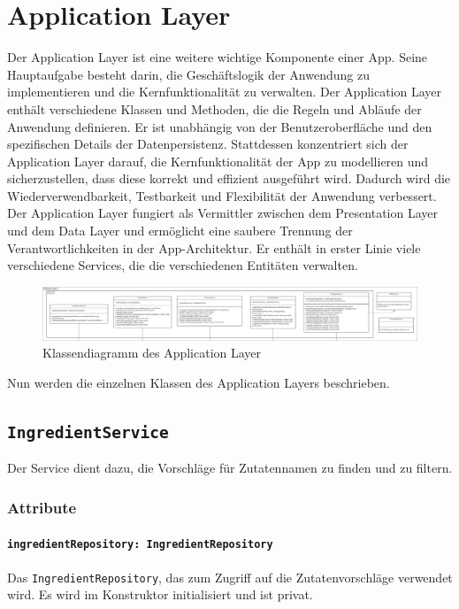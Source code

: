 \documentclass[parskip=full]{scrartcl}
\begin{document}
\section{Application Layer}
Der Application Layer ist eine weitere wichtige Komponente einer App. Seine Hauptaufgabe besteht darin, die Geschäftslogik der Anwendung zu implementieren und die Kernfunktionalität zu verwalten. Der Application Layer enthält verschiedene Klassen und Methoden, die die Regeln und Abläufe der Anwendung definieren. Er ist unabhängig von der Benutzeroberfläche und den spezifischen Details der Datenpersistenz. Stattdessen konzentriert sich der Application Layer darauf, die Kernfunktionalität der App zu modellieren und sicherzustellen, dass diese korrekt und effizient ausgeführt wird. Dadurch wird die Wiederverwendbarkeit, Testbarkeit und Flexibilität der Anwendung verbessert. Der Application Layer fungiert als Vermittler zwischen dem Presentation Layer und dem Data Layer und ermöglicht eine saubere Trennung der Verantwortlichkeiten in der App-Architektur.
Er enthält in erster Linie viele verschiedene Services, die die verschiedenen Entitäten verwalten.
\begin{figure}[htp]
    \centering
    \includegraphics[width = \textwidth]{images/applicationLayer/applicationLayer.pdf}
    \caption{Klassendiagramm des Application Layer}
    \label{fig:application-layer}
\end{figure}

Nun werden die einzelnen Klassen des Application Layers beschrieben.
\newpage
\subsection{\texttt{IngredientService}}
Der Service dient dazu, die Vorschläge für Zutatennamen zu finden und zu filtern.
\subsubsection*{Attribute}
\paragraph{\texttt{ingredientRepository: IngredientRepository}}
Das \texttt{IngredientRepository}, das zum Zugriff auf die Zutatenvorschläge verwendet wird. Es wird im Konstruktor initialisiert und ist privat.
\end{document}

